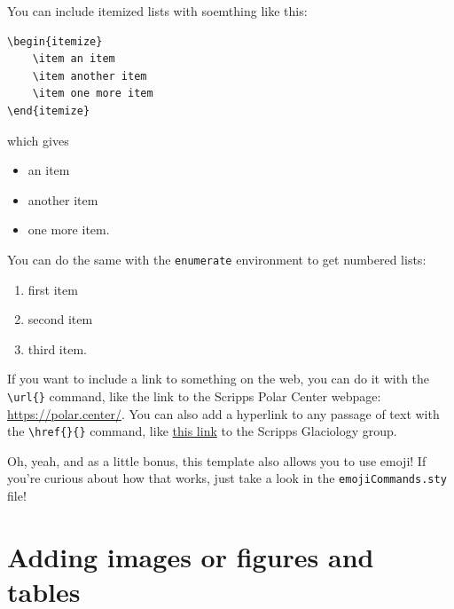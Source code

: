 \documentclass[letterus,times]{SIOpset}
\begin{document}
You can include itemized lists with soemthing like this:
\begin{verbatim}
\begin{itemize}
    \item an item
    \item another item
    \item one more item
\end{itemize}
\end{verbatim}
which gives 
\begin{itemize}
    \item an item
    \item another item
    \item one more item.
\end{itemize}
You can do the same with the \verb|enumerate| environment to get numbered lists:
\begin{enumerate}
    \item first item
    \item second item
    \item third item.
\end{enumerate}

If you want to include a link to something on the web, you can do it with the \verb|\url{}| command, like the link to the Scripps Polar Center webpage: \url{https://polar.center/}. 
You can also add a hyperlink to any passage of text with the \verb|\href{}{}| command, like \href{http://glaciology.weebly.com/}{this link} to the Scripps Glaciology group. 

Oh, yeah, and as a little bonus, this template also allows you to use emoji! If you're curious about how that works, just take a look in the \texttt{emojiCommands.sty} file! \thumb \graduation

\section{Adding images or figures and tables}
\end{document}
